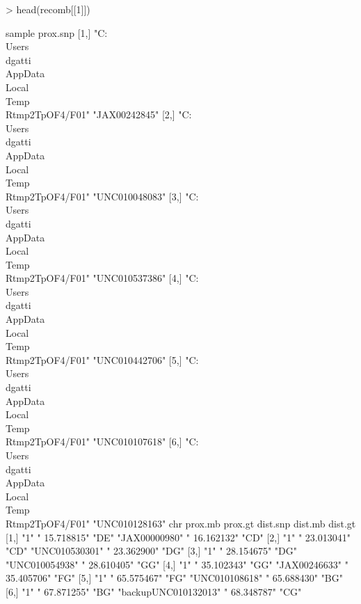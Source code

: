 \documentclass{article}
\begin{document}
\begin{Schunk}
\begin{Sinput}
> head(recomb[[1]])
\end{Sinput}
\begin{Soutput}
     sample                                                    prox.snp      
[1,] "C:\\Users\\dgatti\\AppData\\Local\\Temp\\Rtmp2TpOF4/F01" "JAX00242845" 
[2,] "C:\\Users\\dgatti\\AppData\\Local\\Temp\\Rtmp2TpOF4/F01" "UNC010048083"
[3,] "C:\\Users\\dgatti\\AppData\\Local\\Temp\\Rtmp2TpOF4/F01" "UNC010537386"
[4,] "C:\\Users\\dgatti\\AppData\\Local\\Temp\\Rtmp2TpOF4/F01" "UNC010442706"
[5,] "C:\\Users\\dgatti\\AppData\\Local\\Temp\\Rtmp2TpOF4/F01" "UNC010107618"
[6,] "C:\\Users\\dgatti\\AppData\\Local\\Temp\\Rtmp2TpOF4/F01" "UNC010128163"
     chr prox.mb      prox.gt dist.snp             dist.mb      dist.gt
[1,] "1" " 15.718815" "DE"    "JAX00000980"        " 16.162132" "CD"   
[2,] "1" " 23.013041" "CD"    "UNC010530301"       " 23.362900" "DG"   
[3,] "1" " 28.154675" "DG"    "UNC010054938"       " 28.610405" "GG"   
[4,] "1" " 35.102343" "GG"    "JAX00246633"        " 35.405706" "FG"   
[5,] "1" " 65.575467" "FG"    "UNC010108618"       " 65.688430" "BG"   
[6,] "1" " 67.871255" "BG"    "backupUNC010132013" " 68.348787" "CG"   
\end{Soutput}
\end{Schunk}
\end{document}
